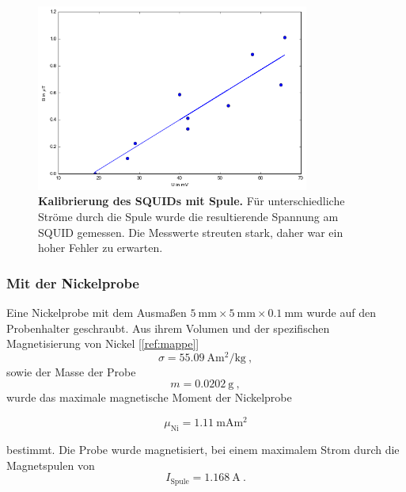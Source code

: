 \documentclass[a4paper,ngerman]{scrartcl}
\begin{document}
\begin{figure}
\centering
\includegraphics[width=0.8\textwidth]{abbildungen/kalibrierung_spule.png}
\caption[Kalibrierung des SQUIDs mit Spule]{\textbf{Kalibrierung des SQUIDs mit Spule.} Für unterschiedliche Ströme durch die Spule wurde die resultierende Spannung am SQUID gemessen. Die Messwerte streuten stark, daher war ein hoher Fehler zu erwarten.}
\label{fig:Kalibrierung-Magnetfeld}
\end{figure}




\subsubsection*{Mit der Nickelprobe}

Eine Nickelprobe mit dem Ausmaßen $\SI{5}{\mm} \times \SI{5}{\mm} \times \SI{0.1}{\mm}$ wurde auf den Probenhalter geschraubt.
Aus ihrem Volumen und der spezifischen Magnetisierung von Nickel [\ref{ref:mappe}]
\begin{equation}
\sigma = \SI{55.09}{\ampere \square \meter \per \kg} ~,
\end{equation}
sowie der Masse der Probe 
\begin{equation}
m = \SI{0.0202}{\gram} ~,
\end{equation}
wurde das maximale magnetische Moment der Nickelprobe 

\begin{equation}
\mu_{\mathrm{Ni}} = \SI{1.11}{\mA \square \meter}
\end{equation}

bestimmt. Die Probe wurde magnetisiert, bei einem maximalem Strom durch die Magnetspulen von
\begin{equation}
I_{\mathrm{Spule}} = \SI{1.168}{\ampere} ~.
\end{equation}
\end{document}
